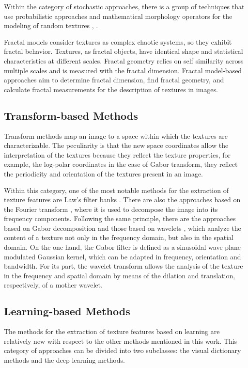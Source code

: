 Within the category of stochastic approaches, there is a group of techniques that use probabilistic approaches and mathematical morphology operators for the modeling of random textures \citep{Serra:CGIM:1980}, \citep{Cord.Bach.ea:JoM:2010}.

Fractal models consider textures as complex chaotic systems, so they exhibit fractal behavior. Textures, as fractal objects, have identical shape and statistical characteristics at different scales. Fractal geometry relies on self similarity across multiple scales and is measured with the fractal dimension. Fractal model-based approaches aim to determine fractal dimension, find fractal geometry, and calculate fractal measurements for the description of textures in images.


\subsection{Transform-based Methods}
Transform methods map an image to a space within which the textures are characterizable. The peculiarity is that the new space coordinates allow the interpretation of the textures because they reflect the texture properties, for example, the log-polar coordinates in the case of Gabor transform, they reflect the periodicity and orientation of the textures present in an image.

Within this category, one of the most notable methods for the extraction of texture features are Law's filter banks \citep{Laws:IUW:1979, Laws:IPMG:1980, Laws:Report:1980}. There are also the approaches based on the Fourier transform \citep{Ursani.Kpalma.ea:ICMV:2007}, where it is used to decompose the image into its frequency components. Following the same principle, there are the approaches based on Gabor decomposition \citep{Gabor:JIEE:1946} and those based on wavelets \citep{Arivazhagan.Ganesan:PR:2003}, which analyze the content of a texture not only in the frequency domain, but also in the spatial domain. On the one hand, the Gabor filter is defined as a sinusoidal wave plane modulated Gaussian kernel, which can be adapted in frequency, orientation and bandwidth. For its part, the wavelet transform allows the analysis of the texture in the frequency and spatial domain by means of the dilation and translation, respectively, of a mother wavelet.

\subsection{Learning-based Methods}
The methods for the extraction of texture features based on learning are relatively new with respect to the other methods mentioned in this work.
This category of approaches can be divided into two subclasses: the visual dictionary methods and the deep learning methods.


